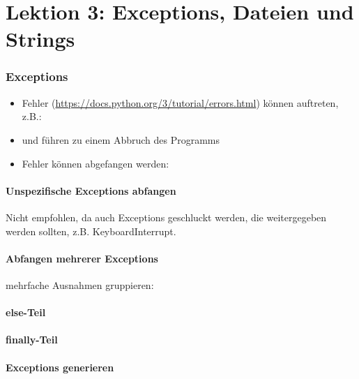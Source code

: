 \part*{Lektion 3: Exceptions, Dateien und Strings}
\section{Exceptions}
\begin{itemize}
	\item Fehler (\url{https://docs.python.org/3/tutorial/errors.html}) können auftreten, z.B.:
	
	\item und führen zu einem Abbruch des Programms
	\item Fehler können abgefangen werden:
	
\end{itemize}

\subsection{Unspezifische Exceptions abfangen}
Nicht empfohlen, da auch Exceptions geschluckt werden, die weitergegeben werden sollten, z.B. KeyboardInterrupt.\\


\subsection{Abfangen mehrerer Exceptions}

mehrfache Ausnahmen gruppieren:\\


\subsection{else-Teil}


\subsection{finally-Teil}


\subsection{Exceptions generieren}



